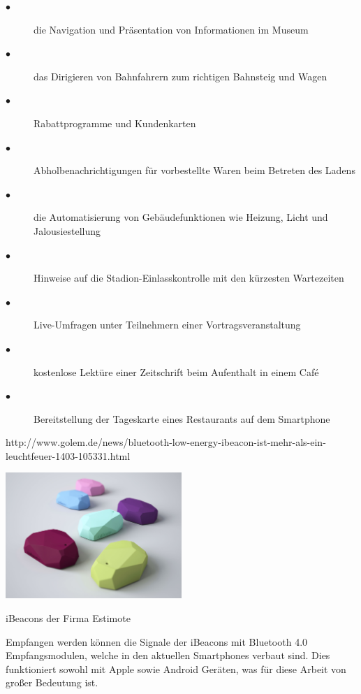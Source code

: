 \begin{description}
\item[$\bullet$]die Navigation und Präsentation von Informationen im Museum

\item[$\bullet$]das Dirigieren von Bahnfahrern zum richtigen Bahnsteig und Wagen

\item[$\bullet$]Rabattprogramme und Kundenkarten

\item[$\bullet$]Abholbenachrichtigungen für vorbestellte Waren beim Betreten des Ladens

\item[$\bullet$]die Automatisierung von Gebäudefunktionen wie Heizung, Licht und Jalousiestellung

\item[$\bullet$]Hinweise auf die Stadion-Einlasskontrolle mit den kürzesten Wartezeiten

\item[$\bullet$]Live-Umfragen unter Teilnehmern einer Vortragsveranstaltung

\item[$\bullet$]kostenlose Lektüre einer Zeitschrift beim Aufenthalt in einem Café

\item[$\bullet$]Bereitstellung der Tageskarte eines Restaurants auf dem Smartphone

\end{description}

http://www.golem.de/news/bluetooth-low-energy-ibeacon-ist-mehr-als-ein-leuchtfeuer-1403-105331.html

\includegraphics[width=0.5\textwidth]{ref/images/ibeacon.jpg}


iBeacons der Firma Estimote

Empfangen werden können die Signale der iBeacons mit Bluetooth 4.0 Empfangsmodulen, welche in den aktuellen Smartphones verbaut sind. Dies funktioniert sowohl mit Apple sowie Android Geräten, was für diese Arbeit von großer Bedeutung ist.


